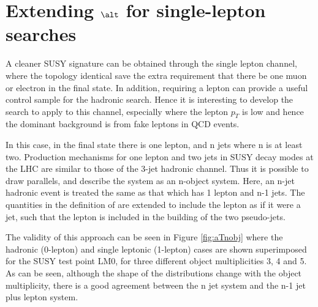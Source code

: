 \section{Extending $\alt$ for single-lepton searches}
\label{sec:lalt}
A cleaner SUSY signature can be obtained through the single lepton channel, where the topology identical save the extra requirement that there be one muon or electron in the final state. In addition, requiring a lepton can provide a useful control sample for the hadronic search. Hence it is interesting to develop the \alt search to apply to this channel, especially where the lepton $p_{T}$ is low and hence the dominant background is from fake leptons in QCD events. 

In this case, in the final state there is one lepton, and n jets where n is at least two. Production mechanisms for one lepton and two jets in SUSY decay modes at the LHC are similar to those of the 3-jet hadronic channel. Thus it is possible to draw parallels, and describe the system as an n-object system. Here, an n-jet hadronic event is treated the same as that which has 1 lepton and n-1 jets.  The quantities in the definition of \alt are extended to include the lepton as if it were a jet, such that the lepton is included in the building of the two pseudo-jets. 

The validity of this approach can be seen in Figure \ref{fig:aTnobj} where the hadronic (0-lepton) and single leptonic (1-lepton) cases are shown superimposed for the SUSY test point LM0, for three different object multiplicities 3, 4 and 5\cite{an2009_188}. As can be seen, although the shape of the \alt distributions change with the object multiplicity, there is a good agreement between the n jet system and the n-1 jet plus lepton system. 

